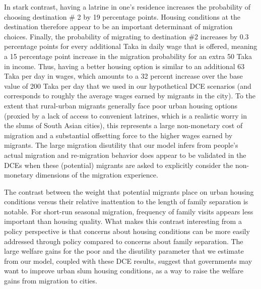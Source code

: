 \documentclass[12pt,pdftex]{article}
\begin{document}
In stark contrast, having a latrine in one's residence increases the probability of choosing destination \# 2 by 19 percentage points. Housing conditions at the destination therefore appear to be an important determinant of migration choices. Finally, the probability of migrating to destination \#2 increases by 0.3 percentage points for every additional Taka in daily wage that is offered, meaning a 15 percentage point increase in the migration probability for an extra 50 Taka in income. Thus, having a better housing option is similar to an additional 63 Taka per day in wages, which amounts to a 32 percent increase over the base value of 200 Taka per day that we used in our hypothetical DCE scenarios (and corresponds to roughly the average wages earned by migrants in the city). To the extent that rural-urban migrants generally face poor urban housing options (proxied by a lack of access to convenient latrines, which is a realistic worry in the slums of South Asian cities), this represents a large non-monetary cost of migration and a substantial offsetting force to the higher wages earned by migrants. The large migration disutility that our model infers from people's actual migration and re-migration behavior does appear to be validated in the DCEs when these (potential) migrants are asked to explicitly consider the non-monetary dimensions of the migration experience.

The contrast between the weight that potential migrants place on urban housing conditions versus their relative inattention to the length of family separation is notable. For short-run seasonal migration, frequency of family visits appears less important than housing quality. What makes this contrast interesting from a policy perspective is that concerns about housing conditions can be more easily addressed through policy compared to concerns about family separation. The large welfare gains for the poor and the disutility parameter that we estimate from our model, coupled with these DCE results, suggest that governments may want to improve urban slum housing conditions, as a way to raise the welfare gains from migration to cities.
\end{document}
